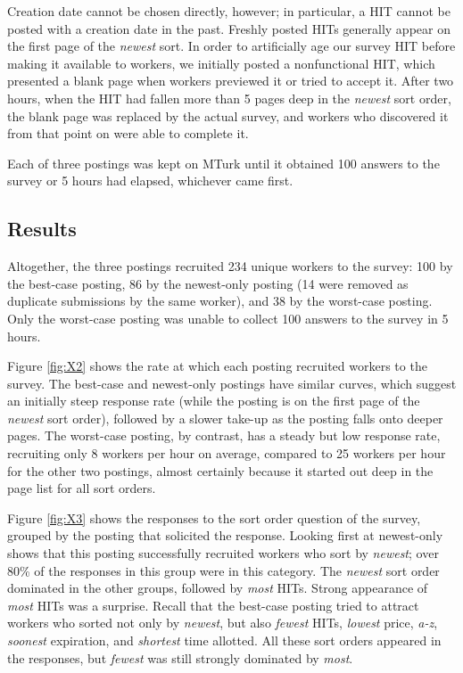 \documentclass{acm_proc_article-sp}
\begin{document}
Creation date cannot be chosen directly, however; in particular, a HIT
cannot be posted with a creation date in the past.  Freshly posted
HITs generally appear on the first page of the {\em newest} sort.  In
order to artificially age our survey HIT before making it available to
workers, we initially posted a nonfunctional HIT, which presented a
blank page when workers previewed it or tried to accept it.  After two
hours, when the HIT had fallen more than 5 pages deep in the {\em
  newest} sort order, the blank page was replaced by the actual
survey, and workers who discovered it from that point on were able to
complete it.

Each of three postings was kept on MTurk until it obtained 100 answers
to the survey or 5 hours had elapsed, whichever came first.

\subsection{Results}
Altogether, the three postings recruited 234 unique workers to the
survey: 100 by the best-case posting, 86 by the newest-only posting
(14 were removed as duplicate submissions by the same worker), and 38
by the worst-case posting.  Only the worst-case posting was unable to
collect 100 answers to the survey in 5 hours.

Figure \ref{fig:X2} shows the rate at which each posting recruited workers to
the survey.  The best-case and newest-only postings have similar
curves, which suggest an initially steep response rate (while the
posting is on the first page of the {\em newest} sort order), followed
by a slower take-up as the posting falls onto deeper pages.  The
worst-case posting, by contrast, has a steady but low response rate,
recruiting only 8 workers per hour on average, compared to 25 workers
per hour for the other two postings, almost certainly because it
started out deep in the page list for all sort orders.

Figure \ref{fig:X3} shows the responses to the sort order question of
the survey, grouped by the posting that solicited the response.
Looking first at newest-only shows that this posting successfully
recruited workers who sort by {\em newest}; over 80\% of the responses
in this group were in this category.  The {\em newest} sort order
dominated in the other groups, followed by {\em most} HITs.  Strong
appearance of {\em most} HITs was a surprise.  Recall that the
best-case posting tried to attract workers who sorted not only by {\em
  newest}, but also {\em fewest} HITs, {\em lowest} price, {\em a-z},
{\em soonest} expiration, and {\em shortest} time allotted.  All these
sort orders appeared in the responses, but {\em fewest} was still
strongly dominated by {\em most}.
\end{document}

